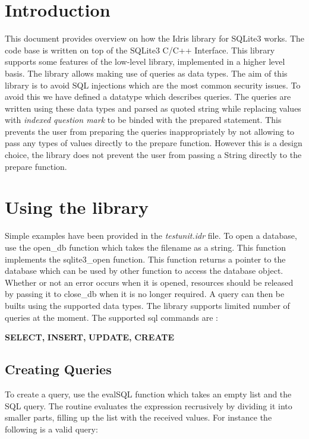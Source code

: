 \documentclass[11pt]{article}
\begin{document}
         
 \section{Introduction}
\label{Introduction} 
This document provides overview on how the Idris library for SQLite3 works. The code base is written on top of the
SQLite3 C/C++ Interface.
This library supports some features of the low-level library, implemented in a higher level basis.
The library allows making use of queries as data types. The aim of this library is to avoid
SQL injections which are the most common security issues.
To avoid this we have defined a datatype which describes queries.
The queries are written using these data types and parsed as quoted string
while replacing values with \emph{indexed question mark} to be binded with the prepared statement.
This prevents the user from preparing the queries inappropriately by not allowing to pass
any types of values directly to the prepare function. However this is a design choice, the library
does not prevent the user from passing a String directly to the prepare function.

\section{Using the library}
\label{Using the library}
Simple examples have been provided in the \emph{testunit.idr} file.
To open a database, use the open\_db function which takes the filename as a string. 
This function implements the sqlite3\_open function.
This function returns a pointer to the database which can be used by other function
to access the database object.
Whether or not an error occurs when it is opened,
resources should be released by passing it to close\_db when it is no longer required.
A query can then be builts using the supported data types.
The library supports limited number of queries at the moment. The supported sql commands are :
\newline

\textbf{SELECT,}
\textbf{INSERT,}
\textbf{UPDATE,}
\textbf{CREATE}

\subsection{Creating Queries}
\label{Creating Queries}

To create a query, use the evalSQL function which takes an empty list and the SQL query.
The routine evaluates the expression recrusively by dividing it into smaller parts,
filling up the list with the received values. For instance the following is a valid query:
\end{document}
